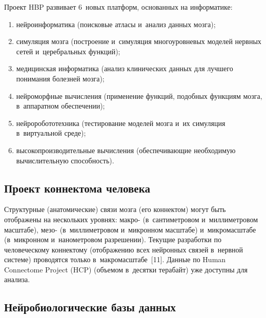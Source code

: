\begin{multicols}{2}
  Проект HBP развивает 6~новых платформ, основанных на информатике: 
  \begin{enumerate}[(1)]
\item нейроинформатика (поисковые атласы и~анализ данных мозга);\\[-15pt]
\item симуляция мозга (построение и~симуляция многоуровневых моделей нервных сетей 
и~церебральных функций);\\[-15pt]
\item медицинская информатика (анализ клинических данных для лучшего 
понимания болезней мозга);\\[-15pt]
\item нейроморфные вычисления (применение функций, подобных функциям мозга, 
в~аппаратном обеспечении);\\[-15pt]
\item нейроробототехника (тестирование моделей мозга и~их симуляция 
в~виртуальной среде);\\[-15pt]
\item высокопроизводительные вычисления (обеспечивающие необходимую 
вычислительную способность).
\end{enumerate}

\vspace*{-12pt}

\subsection{Проект коннектома человека}
  
  Структурные (анатомические) связи мозга (его коннектом) могут быть отображены на 
нескольких уровнях: макро- (в~сантиметровом и~миллиметровом масштабе), мезо- 
(в~миллиметровом и~микронном масштабе) и~микромасштабе (в~микронном 
и~нанометровом разрешении). Текущие разработки по человеческому коннектому 
(отображению всех нейронных связей в~нервной системе) проводятся только 
в~макромасштабе~[11]. Данные по Human Connectome Project (HCP) (объемом в~десятки терабайт) уже доступны для 
анализа. 

\subsection{Нейробиологические базы данных}


\end{multicols}
